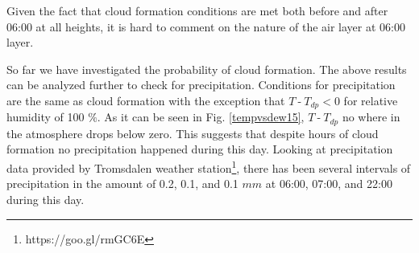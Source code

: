 \documentclass[a4paper,12pt]{article}
\numberwithin{equation}{section} %
\begin{document}
Given the fact that cloud formation conditions are met both before and after 06:00 at all heights, it is hard to comment on the nature of the air layer at 06:00 layer.

So far we have investigated the probability of cloud formation. The above results can be analyzed further to check for precipitation. Conditions for precipitation are the same as cloud formation with the exception that $T\:$-$\:T_{dp} < 0$ for relative humidity of 100 $\%$. As it can be seen in Fig. \ref{tempvsdew15}, $T\:$-$\:T_{dp}$ no where in the atmosphere drops below zero. This suggests that despite hours of cloud formation no precipitation happened during this day. Looking at precipitation data provided by Tromsdalen weather station\footnote{https://goo.gl/rmGC6E}, there has been several intervals of precipitation in the amount of 0.2, 0.1, and 0.1 $mm$ at 06:00, 07:00, and 22:00 during this day.

 
\end{document}
